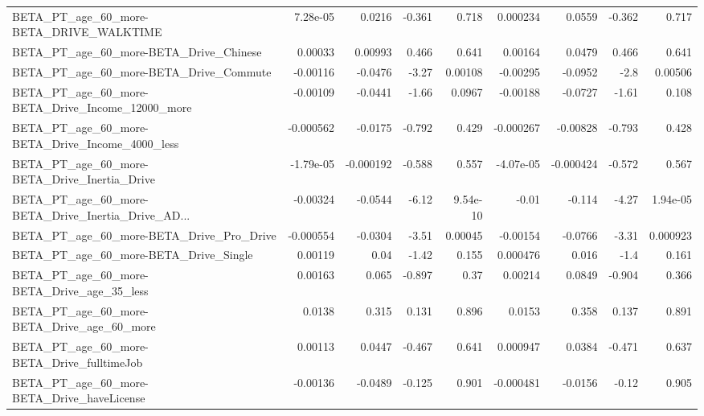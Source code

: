 \begin{tabular}{lrrrrrrrr}
BETA\_PT\_age\_60\_more-BETA\_DRIVE\_WALKTIME            &    7.28e-05 &       0.0216 &   -0.361 &    0.718 &   0.000234 &      0.0559 &       -0.362 &         0.717 \\
BETA\_PT\_age\_60\_more-BETA\_Drive\_Chinese             &     0.00033 &      0.00993 &    0.466 &    0.641 &    0.00164 &      0.0479 &        0.466 &         0.641 \\
BETA\_PT\_age\_60\_more-BETA\_Drive\_Commute             &    -0.00116 &      -0.0476 &    -3.27 &  0.00108 &   -0.00295 &     -0.0952 &         -2.8 &       0.00506 \\
BETA\_PT\_age\_60\_more-BETA\_Drive\_Income\_12000\_more   &    -0.00109 &      -0.0441 &    -1.66 &   0.0967 &   -0.00188 &     -0.0727 &        -1.61 &         0.108 \\
BETA\_PT\_age\_60\_more-BETA\_Drive\_Income\_4000\_less    &   -0.000562 &      -0.0175 &   -0.792 &    0.429 &  -0.000267 &    -0.00828 &       -0.793 &         0.428 \\
BETA\_PT\_age\_60\_more-BETA\_Drive\_Inertia\_Drive       &   -1.79e-05 &    -0.000192 &   -0.588 &    0.557 &  -4.07e-05 &   -0.000424 &       -0.572 &         0.567 \\
BETA\_PT\_age\_60\_more-BETA\_Drive\_Inertia\_Drive\_AD... &    -0.00324 &      -0.0544 &    -6.12 & 9.54e-10 &      -0.01 &      -0.114 &        -4.27 &      1.94e-05 \\
BETA\_PT\_age\_60\_more-BETA\_Drive\_Pro\_Drive           &   -0.000554 &      -0.0304 &    -3.51 &  0.00045 &   -0.00154 &     -0.0766 &        -3.31 &      0.000923 \\
BETA\_PT\_age\_60\_more-BETA\_Drive\_Single              &     0.00119 &         0.04 &    -1.42 &    0.155 &   0.000476 &       0.016 &         -1.4 &         0.161 \\
BETA\_PT\_age\_60\_more-BETA\_Drive\_age\_35\_less         &     0.00163 &        0.065 &   -0.897 &     0.37 &    0.00214 &      0.0849 &       -0.904 &         0.366 \\
BETA\_PT\_age\_60\_more-BETA\_Drive\_age\_60\_more         &      0.0138 &        0.315 &    0.131 &    0.896 &     0.0153 &       0.358 &        0.137 &         0.891 \\
BETA\_PT\_age\_60\_more-BETA\_Drive\_fulltimeJob         &     0.00113 &       0.0447 &   -0.467 &    0.641 &   0.000947 &      0.0384 &       -0.471 &         0.637 \\
BETA\_PT\_age\_60\_more-BETA\_Drive\_haveLicense         &    -0.00136 &      -0.0489 &   -0.125 &    0.901 &  -0.000481 &     -0.0156 &        -0.12 &         0.905 \\

\end{tabular}
